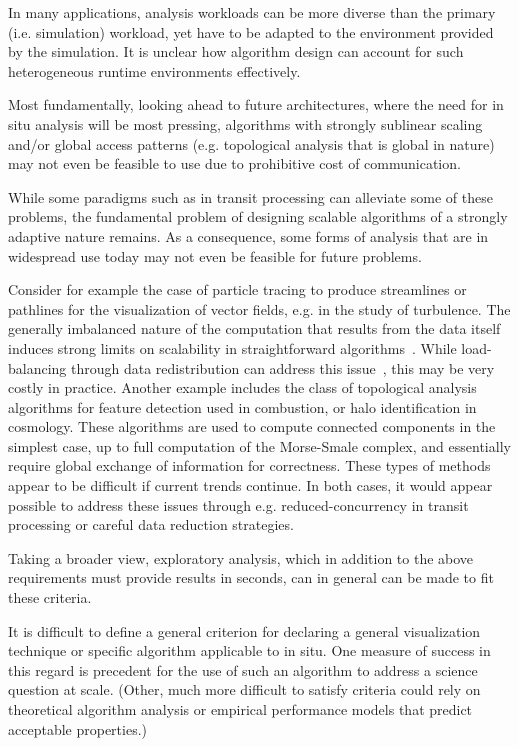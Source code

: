 \begin{refsection}
In many applications, analysis workloads can be more diverse than the primary (i.e. simulation) workload, yet have to be adapted to the environment provided by the simulation. It is unclear how algorithm design can account for such heterogeneous runtime environments effectively.

Most fundamentally, looking ahead to future architectures, where the need for in situ analysis will be most pressing, algorithms with strongly sublinear scaling and/or global access patterns (e.g. topological analysis that is global in nature) may not even be feasible to use due to prohibitive cost of communication. 

While some paradigms such as in transit processing can alleviate some of these problems, the fundamental problem of designing scalable algorithms of a strongly adaptive nature remains. As a consequence, some forms of analysis that are in widespread use today may not even be feasible for future problems.

Consider for example the case of particle tracing to produce streamlines or pathlines for the visualization of vector fields, e.g. in the study of turbulence. The generally imbalanced nature of the computation that results from the data itself induces strong limits on scalability in straightforward algorithms~\cite{Pugmire09}. While load-balancing through data redistribution can address this issue~\cite{Nouanesengsy11}, this may be very costly in practice. Another example includes the class of topological analysis algorithms for feature detection used in combustion, or halo identification in cosmology. These algorithms are used to compute connected components in the simplest case, up to full computation of the Morse-Smale complex, and essentially require global exchange of information for correctness. These types of methods appear to be difficult if current trends continue. In both cases, it would appear possible to address these issues through e.g. reduced-concurrency in transit processing or careful data reduction strategies.

Taking a broader view, exploratory analysis, which in addition to the above requirements must provide results in seconds, can in general can be made to fit these criteria.

It is difficult to define a general criterion for declaring a general visualization technique or specific algorithm applicable to  in situ. One measure of success in this regard is precedent for the use of such an algorithm to address a science question at scale. (Other, much more difficult to satisfy criteria could rely on theoretical algorithm analysis or empirical performance models that predict acceptable properties.)


\end{refsection}

